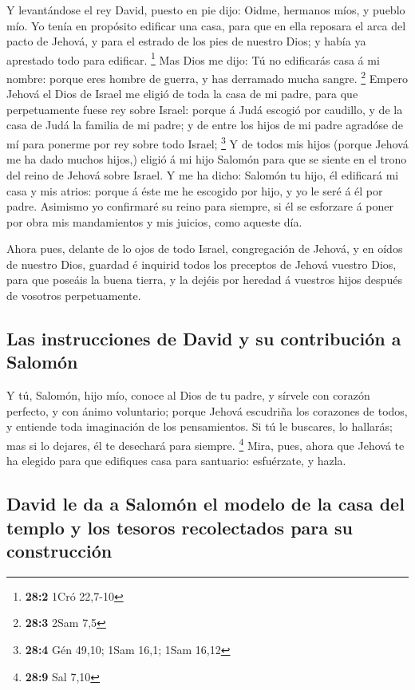  Y levantándose el rey David, puesto en pie dijo: Oidme,
hermanos míos, y pueblo mío. Yo tenía en propósito edificar una casa,
para que en ella reposara el arca del pacto de Jehová, y para el estrado
de los pies de nuestro Dios; y había ya aprestado todo para edificar.
\footnote{\textbf{28:2} 1Cró 22,7-10}  Mas Dios me dijo: Tú
no edificarás casa á mi nombre: porque eres hombre de guerra, y has
derramado mucha sangre. \footnote{\textbf{28:3} 2Sam 7,5} 
Empero Jehová el Dios de Israel me eligió de toda la casa de mi padre,
para que perpetuamente fuese rey sobre Israel: porque á Judá escogió por
caudillo, y de la casa de Judá la familia de mi padre; y de entre los
hijos de mi padre agradóse de mí para ponerme por rey sobre todo Israel;
\footnote{\textbf{28:4} Gén 49,10; 1Sam 16,1; 1Sam 16,12}  Y
de todos mis hijos (porque Jehová me ha dado muchos hijos,) eligió á mi
hijo Salomón para que se siente en el trono del reino de Jehová sobre
Israel.  Y me ha dicho: Salomón tu hijo, él edificará mi
casa y mis atrios: porque á éste me he escogido por hijo, y yo le seré á
él por padre.  Asimismo yo confirmaré su reino para siempre,
si él se esforzare á poner por obra mis mandamientos y mis juicios, como
aqueste día.

 Ahora pues, delante de lo ojos de todo Israel, congregación
de Jehová, y en oídos de nuestro Dios, guardad é inquirid todos los
preceptos de Jehová vuestro Dios, para que poseáis la buena tierra, y la
dejéis por heredad á vuestros hijos después de vosotros perpetuamente.

\hypertarget{las-instrucciones-de-david-y-su-contribuciuxf3n-a-salomuxf3n}{%
\subsection{Las instrucciones de David y su contribución a
Salomón}\label{las-instrucciones-de-david-y-su-contribuciuxf3n-a-salomuxf3n}}

 Y tú, Salomón, hijo mío, conoce al Dios de tu padre, y
sírvele con corazón perfecto, y con ánimo voluntario; porque Jehová
escudriña los corazones de todos, y entiende toda imaginación de los
pensamientos. Si tú le buscares, lo hallarás; mas si lo dejares, él te
desechará para siempre. \footnote{\textbf{28:9} Sal 7,10} 
Mira, pues, ahora que Jehová te ha elegido para que edifiques casa para
santuario: esfuérzate, y hazla.

\hypertarget{david-le-da-a-salomuxf3n-el-modelo-de-la-casa-del-templo-y-los-tesoros-recolectados-para-su-construcciuxf3n}{%
\subsection{David le da a Salomón el modelo de la casa del templo y los
tesoros recolectados para su
construcción}\label{david-le-da-a-salomuxf3n-el-modelo-de-la-casa-del-templo-y-los-tesoros-recolectados-para-su-construcciuxf3n}}

